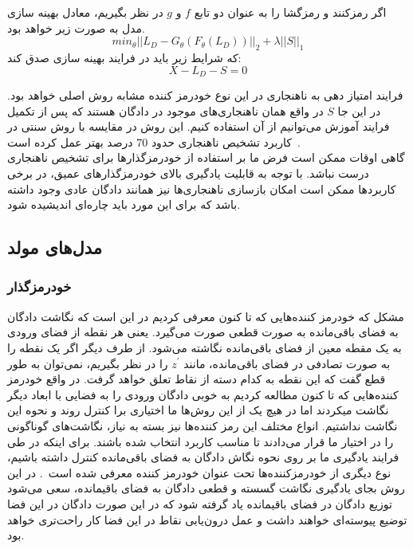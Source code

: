 \documentclass[12pt,a4paper]{report}
\theoremstyle{definition}
\theoremstyle{definition}
\begin{document}
اگر رمزکنند و رمزگشا را به عنوان دو تابع $f$ و $g$ در نظر بگیریم، معادل بهینه سازی مدل به صورت زیر خواهد بود.
\begin{equation}
	min_{\theta} || L_D - G_\theta(F_\theta(L_D)) ||_2 + \lambda ||S||_1
\end{equation}
که شرایط زیر باید در فرایند بهینه سازی صدق کند:
\begin{equation}
X-L_D-S=0
\end{equation}

فرایند امتیاز دهی به ناهنجاری در این نوع خودرمز کننده مشابه روش اصلی خواهد بود. در این جا $S$ در واقع همان ناهنجاری‌های موجود در دادگان هستند که پس از تکمیل فرایند آموزش می‌توانیم از آن استفاده کنیم. این روش در مقایسه با روش سنتی در کاربرد تشخیص ناهنجاری حدود 70 درصد بهتر عمل کرده است~\cite{10.1145/3097983.3098052}.\\

گاهی اوقات ممکن است فرض ما بر استفاده از خودرمزگذار‌ها برای تشخیص ناهنجاری درست نباشد. با توجه به قابلیت یادگیری بالای خودرمزگذار‌های عمیق، در برخی کاربرد‌ها ممکن است امکان بازسازی ناهنجاری‌ها نیز همانند دادگان عادی وجود داشته باشد که برای این مورد باید چاره‌ای اندیشیده شود\cite{https://doi.org/10.48550/arxiv.1904.02639}. 

\subsection{مدل‌های مولد}

\subsubsection{ خودرمزگذار }
مشکل که خودرمز کننده‌هایی که تا کنون معرفی کردیم در این است که نگاشت دادگان به فضای باقی‌مانده به صورت قطعی صورت می‌گیرد. یعنی هر نقطه از فضای ورودی به یک مقطه معین از فضای باقی‌مانده نگاشته می‌شود. از طرف دیگر اگر یک نقطه را به صورت تصادفی در فضای باقی‌مانده، مانند 
$z^{'}$
 را در نظر بگیریم، نمی‌توان به طور قطع گفت که این نقطه به کدام دسته از نقاط تعلق خواهد گرفت. در واقع خودرمز کننده‌هایی که تا کنون مطالعه کردیم به خوبی دادگان ورودی را به فضایی با ابعاد دیگر نگاشت میکردند اما در هیچ یک از این روش‌ها ما اختیاری برا کنترل روند و نحوه این نگاشت نداشتیم. انواع مختلف این رمز کننده‌ها نیز بسته به نیاز، نگاشت‌های گوناگونی را در اختیار ما قرار می‌دادند تا مناسب کاربرد انتخاب شده باشند. برای اینکه در طی فرایند یادگیری ما بر روی نحوه نگاش دادگان به فضای باقی‌مانده کنترل داشته باشیم، نوع دیگری از خودرمزکننده‌ها تحت عنوان خودرمز کننده  معرفی شده است~\cite{vae}. در این روش بجای یادگیری نگاشت گسسته و قطعی دادگان به فضای باقیمانده، سعی می‌شود توزیع دادگان در فضای باقیمانده یاد گرفته شود که در این صورت دادگان در این فضا توضیع پیوسته‌ای خواهند داشت و عمل درون‌یابی نقاط در این فضا کار راحت‌تری خواهد بود.\\
\end{document}
